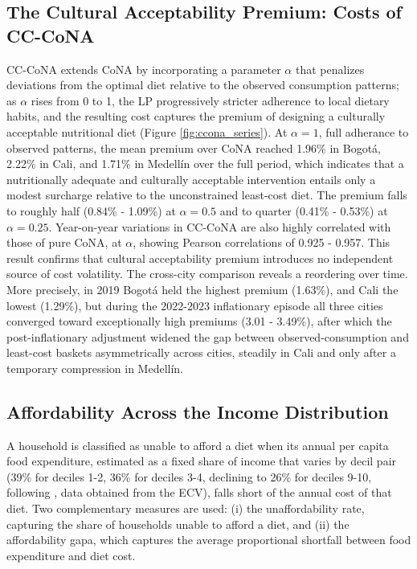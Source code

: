 \documentclass[Afour, sageh,times]{sagej}
\begin{document}
\subsection{The Cultural Acceptability Premium: Costs of CC-CoNA}

CC-CoNA extends CoNA by incorporating a parameter $\alpha$ that penalizes deviations from the optimal diet relative to the observed consumption patterns; as $\alpha$ rises from 0 to 1, the LP progressively stricter adherence to local dietary habits, and the resulting cost captures the premium of designing a culturally acceptable nutritional diet (Figure \ref{fig:ccona_series}). At $\alpha =1$, full adherance to observed patterns, the mean premium over CoNA reached 1.96\% in Bogotá, 2.22\% in Cali, and 1.71\% in Medellín over the full period, which indicates that a nutritionally adequate and culturally acceptable intervention entails only a modest surcharge relative to the unconstrained least-cost diet. The premium falls to roughly half (0.84\% - 1.09\%) at $\alpha = 0.5$ and to quarter (0.41\% - 0.53\%) at $\alpha = 0.25$. Year-on-year variations in CC-CoNA are also highly correlated with those of pure CoNA, at $\alpha$, showing Pearson correlations of 0.925 - 0.957. This result confirms that cultural acceptability premium introduces no independent source of cost volatility. The cross-city comparison reveals a reordering over time. More precisely, in 2019 Bogotá held the highest premium (1.63\%), and Cali the lowest (1.29\%), but during the 2022-2023 inflationary episode all three cities converged toward exceptionally high premiums (3.01 - 3.49\%), after which the post-inflationary adjustment widened the gap between observed-consumption and least-cost baskets asymmetrically across cities, steadily in Cali and only after a temporary compression in Medellín.

\subsection{Affordability Across the Income Distribution}

A household is classified as unable to afford a diet when its annual per capita food expenditure, estimated as a fixed share of income that varies by decil pair (39\% for deciles 1-2, 36\% for deciles 3-4, declining to 26\% for deciles 9-10, following \citep{Yoshioka2026}, data obtained from the ECV), falls short of the annual cost of that diet. Two complementary measures are used: (i) the unaffordability rate, capturing the share of households unable to afford a diet, and (ii) the affordability gapa, which captures the average proportional shortfall between food expenditure and diet cost.
\end{document}
